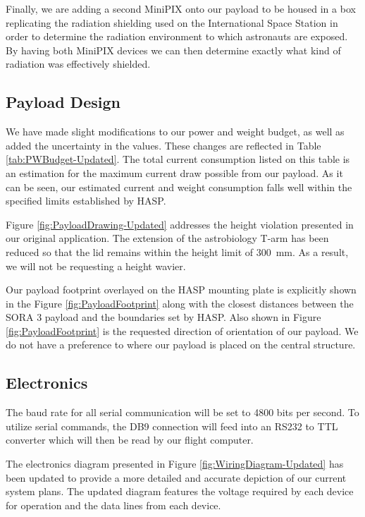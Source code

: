 Finally, we are adding a second MiniPIX onto our payload to be housed in a box replicating the radiation shielding used on the International Space Station in order to determine the radiation environment to which astronauts are exposed. By having both MiniPIX devices we can then determine exactly what kind of radiation was effectively shielded.


\subsection{Payload Design}

We have made slight modifications to our power and weight budget, as well as added the uncertainty in the values. These changes are reflected in Table \ref{tab:PWBudget-Updated}. The total current consumption listed on this table is an estimation for the maximum current draw possible from our payload. As it can be seen, our estimated current and weight consumption falls well within the specified limits established by HASP.

Figure \ref{fig:PayloadDrawing-Updated} addresses the height violation presented in our original application.
The extension of the astrobiology T-arm has been reduced so that the lid remains within the height limit of \SI{300}{\milli\meter}.
As a result, we will not be requesting a height wavier.

Our payload footprint overlayed on the HASP mounting plate is explicitly shown in the Figure \ref{fig:PayloadFootprint} along with the closest distances between the SORA 3 payload and the boundaries set by HASP.
Also shown in Figure \ref{fig:PayloadFootprint} is the requested direction of orientation of our payload.
We do not have a preference to where our payload is placed on the central structure.

\subsection{Electronics}

The baud rate for all serial communication will be set to 4800 bits per second. To utilize serial commands, the DB9 connection will feed into an RS232 to TTL converter which will then be read by our flight computer.

The electronics diagram presented in Figure \ref{fig:WiringDiagram-Updated}  has been updated to provide a more detailed and accurate depiction of our current system plans.
The updated diagram features the voltage required by each device for operation and the data lines from each device.

